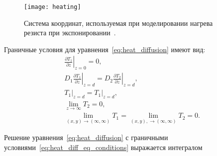 \begin{figure}
	\centering
	\texttt{[image: heating]}
	\caption{Система координат, используемая при моделировании нагрева резиста при экспонировании~\cite{Cui_heating}.}
	\label{fig:free_volume_diffusion}
\end{figure}

Граничные условия для уравнения~\ref{eq:heat_diffusion} имеют вид:
\begin{equation} \label{eq:heat_diff_eq_conditions}
	\begin{aligned}
		&\left.\frac{\partial T_1}{\partial z}\right|_{z=0} = 0, \\
		&D_1 \left.\frac{\partial T_1}{\partial z}\right|_{z=d} = D_2 \left.\frac{\partial T_2}{\partial z}\right|_{z=d}, \\
		&\left.T_1\right|_{z=d}=\left.T_1\right|_{z=d}, \\
		&\lim _{z \rightarrow \infty} T_2 = 0, \\
		&\lim _{(x,y) \rightarrow (\infty, \infty)} T_1 = \lim _{(x,y), \rightarrow (\infty, \infty)} T_2 = 0.
	\end{aligned}
\end{equation}

Решение уравнения~\ref{eq:heat_diffusion} с граничными условиями~\ref{eq:heat_diff_eq_conditions} выражается интегралом

